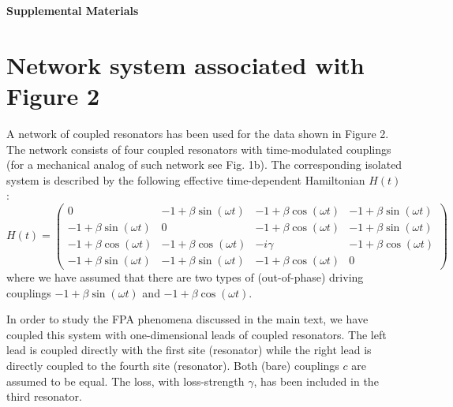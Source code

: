 \documentclass[aps,prl,twocolumn,showpacs,groupedaddress,amsmath,amssymb]{revtex4}
\begin{document}

\begingroup
\clearpage
\onecolumngrid
\appendix



\begin{center}
\textbf{\large Supplemental Materials}
\end{center}

\setcounter{equation}{0}
\setcounter{figure}{0}
\setcounter{table}{0}
\setcounter{page}{1}
\makeatletter
\renewcommand{\theequation}{S\arabic{equation}}
\renewcommand{\thefigure}{S\arabic{figure}}
\renewcommand{\bibnumfmt}[1]{[S#1]}
\renewcommand{\citenumfont}[1]{S#1}

\section{Network system associated with Figure 2}

A network of coupled resonators has been used for the data shown in Figure 2. The network consists of four coupled resonators
with time-modulated couplings (for a mechanical analog of such network see Fig. 1b). The corresponding isolated system is described 
by the following effective time-dependent Hamiltonian $H(t)$:
\begin{equation}
H (t) = \left(\begin{array}{cccc}
  0 & - 1 + \beta \sin (\omega t) & - 1 + \beta \cos (\omega t) & - 1 + \beta
  \sin (\omega t)\\
  - 1 + \beta \sin (\omega t) & 0 & - 1 + \beta \cos (\omega t) & - 1 + \beta
  \sin (\omega t)\\
  - 1 + \beta \cos (\omega t) & - 1 + \beta \cos (\omega t) & - i \gamma & - 1
  + \beta \cos (\omega t)\\
  - 1 + \beta \sin (\omega t) & - 1 + \beta \sin (\omega t) & - 1 + \beta \cos
  (\omega t) & 0
\end{array}\right)
\label{H4}
\end{equation}
where we have assumed that there are two types of (out-of-phase) driving couplings $- 1 + \beta \sin (\omega t)$ and 
$- 1 + \beta \cos (\omega t)$. 

In order to study the FPA phenomena discussed in the main text, we have coupled this system with one-dimensional leads of
coupled resonators. The left lead is coupled directly with the first site (resonator) while the right lead is directly coupled to the
fourth site (resonator). Both (bare) couplings $c$ are assumed to be equal. The loss, with loss-strength $\gamma$, has been 
included in the third resonator.
\end{document}
